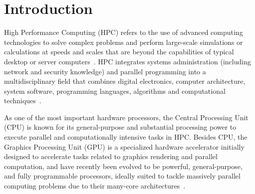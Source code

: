 \section{Introduction}


\par
High Performance Computing (HPC) refers to the use of advanced computing technologies to solve complex problems and perform large-scale simulations or calculations at speeds and scales that are beyond the capabilities of typical desktop or server computers~\cite{hpc}.
HPC integrates systems administration (including network and security knowledge) and parallel programming into a multidisciplinary field that combines digital electronics, computer architecture, system software, programming languages, algorithms and computational techniques~\cite{hpc}.


\par
As one of the most important hardware processors, the Central Processing Unit (CPU) is known for its general-purpose and substantial processing power to execute parallel and computationally intensive tasks in HPC.
Besides CPU, the Graphics Processing Unit (GPU) is a specialized hardware accelerator initially designed to accelerate tasks related to graphics rendering and parallel computation, and have recently been evolved to be powerful, general-purpose, and fully programmable processors, ideally suited to tackle massively parallel computing problems due to their many-core architectures~\cite{gpu_wiki}.


